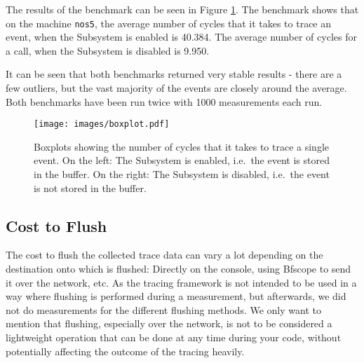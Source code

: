 \documentclass[a4paper,11pt,twoside]{report}
\begin{document}
The results of the benchmark can be seen in Figure \ref{fig:boxplot}. The
benchmark shows that on the machine \texttt{nos5}, the average number of cycles
that it takes to trace an event, when the Subsystem is enabled is 40.384. The
average number of cycles for a call, when the Subsystem is disabled is 9.950.

It can be seen that both benchmarks returned very stable results - there are a
few outliers, but the vast majority of the events are closely around the
average. Both benchmarks have been run twice with 1000 measurements each run.

\begin{figure}[htb]
	\texttt{[image: images/boxplot.pdf]}
	\caption{Boxplots showing the number of cycles that it takes to trace a
	single event. On the left: The Subsystem is enabled, i.e.~the event is
stored in the buffer. On the right: The Subsystem is disabled, i.e.~the event is
not stored in the buffer.}
	\label{fig:boxplot}
\end{figure}

\subsection{Cost to Flush}

The cost to flush the collected trace data can vary a lot depending on the
destination onto which is flushed: Directly on the console, using Bfscope to
send it over the network, etc. As the tracing framework is not intended to be
used in a way where flushing is performed during a measurement, but afterwards,
we did not do measurements for the different flushing methods. We only want to
mention that flushing, especially over the network, is not to be considered a
lightweight operation that can be done at any time during your code, without
potentially affecting the outcome of the tracing heavily.

\end{document}
